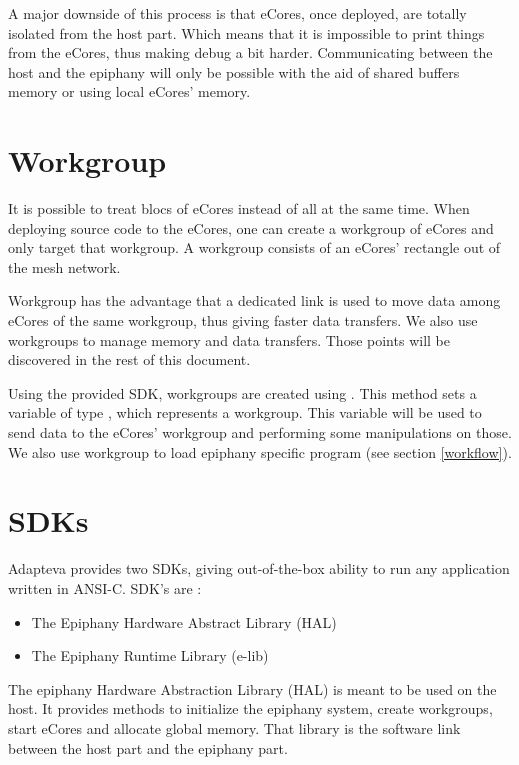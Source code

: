 A major downside of this process is that \glspl{eCore}, once deployed, are totally isolated from the host part. Which means that it is impossible to print things from the \glspl{eCore}, thus making debug a bit harder. Communicating between the host and the \gls{epiphany} will only be possible with the aid of shared buffers memory or using local \glspl{eCore}' memory.

\section{Workgroup} \label{workgroup}

It is possible to treat blocs of \glspl{eCore} instead of all at the same time. When deploying source code to the \glspl{eCore}, one can create a workgroup of \glspl{eCore} and only target that workgroup. A workgroup consists of an \glspl{eCore}' rectangle out of the mesh network.

Workgroup has the advantage that a dedicated link is used to move data among \glspl{eCore} of the same workgroup\cite{epiphanyArch}, thus giving faster data transfers. We also use workgroups to manage memory and data transfers. Those points will be discovered in the rest of this document.

Using the provided \gls{SDK}, workgroups are created using . This method sets a variable of type , which represents a workgroup. This variable will be used to send data to the \glspl{eCore}' workgroup and performing some manipulations on those. We also use workgroup to load \gls{epiphany} specific program (see section \ref{workflow}).

\section{\glspl{SDK}} \label{SDK}

Adapteva provides two \glspl{SDK}, giving out-of-the-box ability to run any application written in ANSI-C. SDK's are :
\begin{itemize}
  \item The Epiphany Hardware Abstract Library (HAL)
  \item The Epiphany Runtime Library (e-lib)
\end{itemize}

The \gls{epiphany} Hardware Abstraction Library (HAL) is meant to be used on the host. It provides methods to initialize the \gls{epiphany} system, create workgroups, start \glspl{eCore} and allocate global memory. That library is the software link between the host part and the \gls{epiphany} part.

